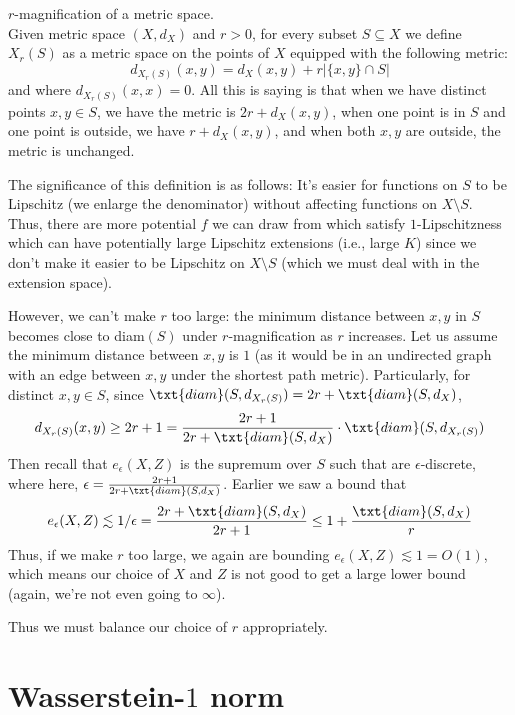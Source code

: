 \begin{df} $r$-magnification of a metric space. \\
Given metric space $(X, d_X)$ and $r > 0$, for every subset $S \subseteq X$ we define
$X_r(S)$ as a metric space on the points of $X$ equipped with the following metric:
\[
d_{X_r(S)}(x, y) = d_X(x, y) + r|\{x, y\} \cap S|
\]
and where $d_{X_r(S)}(x, x) = 0$. 
All this is saying is that when we have distinct points $x, y \in S$, we have the metric is
$2r + d_X(x, y)$, when one point is in $S$ and one point is outside, we have $r + d_X(x, y)$, and
when both $x, y$ are outside, the metric is unchanged.
\end{df}

The significance of this definition is as follows: It's easier for functions on $S$ to be Lipschitz (we enlarge the denominator) without affecting functions on $X \setminus S$. Thus, there are more potential $f$ we can draw from which satisfy $1$-Lipschitzness which can have potentially large Lipschitz extensions (i.e., large $K$) since we don't make it easier to be Lipschitz on $X \setminus S$ (which we must deal with in the extension space).

However, we can't make $r$ too large: the minimum distance between $x, y$ in $S$ becomes close to diam$(S)$ under $r$-magnification as $r$ increases. Let us assume the minimum distance between $x, y$ is $1$ (as it would be in an undirected graph with an edge between $x, y$ under the shortest path metric). Particularly, for distinct $x, y \in S$, since $\txt{diam}(S, d_{X_r(S)}) = 2r + \txt{diam}(S, d_X)$, 
\[
d_{X_r(S)}(x, y) \geq 2r + 1 = \frac{2r + 1}{2r + \txt{diam}(S, d_X)} \cdot \txt{diam}(S, d_{X_r(S)})
\]
Then recall that $e_{\epsilon}(X, Z)$ is the supremum over $S$ such that are $\epsilon$-discrete, where here, $\epsilon = \frac{2r + 1}{2r + \txt{diam}(S, d_X)}$. Earlier we saw a bound that 
\[
e_{\epsilon}(X, Z) \lesssim 1/\epsilon = \frac{2r + \txt{diam}(S, d_X)}{2r + 1} \leq 1 + \frac{\txt{diam}(S, d_X)}{r}
\]
Thus, if we make $r$ too large, we again are bounding $e_{\epsilon}(X, Z) \lesssim 1 = O(1)$, which means our choice of $X$ and $Z$ is not good to get a large lower bound (again, we're not even going to $\infty$). 

Thus we must balance our choice of $r$ appropriately.

\section{Wasserstein-$1$ norm}

